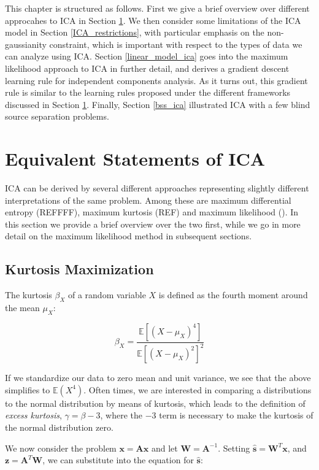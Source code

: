 \documentclass[11pt, oneside, a4paper]{report}
\begin{document}
This chapter is structured as follows. First we give a brief overview
over different approcahes to ICA in Section \ref{equiv_ica}. We then 
consider some limitations of the ICA model in Section \ref{ICA_restrictions}, 
with particular emphasis on the non-gaussianity constraint, which is 
important with respect to the types of data we can analyze using ICA. Section 
\ref{linear_model_ica} goes into the maximum likelihood approach to ICA in 
further detail, and derives a gradient descent learning rule for independent
components analysis. As it turns out, this gradient rule is similar to the 
learning rules proposed under the different frameworks discussed in 
Section \ref{equiv_ica}. Finally, Section \ref{bss_ica} illustrated ICA 
with a few blind source separation problems.


\section{Equivalent Statements of ICA}\label{equiv_ica}

ICA can be derived by several different approaches representing slightly
different interpretations of the same problem. Among these are maximum 
differential entropy (REFFFF), maximum kurtosis (REF) and 
maximum likelihood (\cite{Pham}). 
In this section we provide a brief overview over the two first, while we
go in more detail on the maximum likelihood method in subsequent sections.

\subsection{Kurtosis Maximization}

The kurtosis $\beta_X$ of a random variable $X$ is defined as the fourth
moment around the mean $\mu_X$:


\begin{equation}
  \beta_X = \frac{\mathbb{E}[(X-\mu_X)^4]}{\mathbb{E}[(X-\mu_X)^2]^2} 
\end{equation}

If we standardize our data to zero mean and unit variance, we see that
the above simplifies to $\mathbb{E}(X^4)$. Often times, we are
interested in comparing a distributions to the normal distribution by
means of kurtosis, which leads to the definition of \emph{excess
  kurtosis}, $\gamma = \beta - 3$, where the $-3$ term is necessary to
make the kurtosis of the normal distribution zero. 

We now consider the problem $\boldsymbol{x}=\boldsymbol{A}\boldsymbol{x}$ 
and let $\boldsymbol{W} = \boldsymbol{A}^{-1}$. Setting 
$\hat{\boldsymbol{s}} = \boldsymbol{W}^T\boldsymbol{x}$, and
$\boldsymbol{z} = \boldsymbol{A}^T\boldsymbol{W}$, we can substitute into
the equation for $\hat{\boldsymbol{s}}$:
\end{document}
